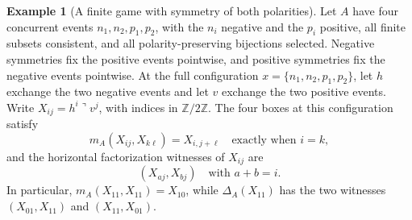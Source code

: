 \documentclass[oneside]{article}
\newcommand{\trcorner}{\mathbin{\urcorner}}
\theoremstyle{plain}
\theoremstyle{definition}
\newtheorem{example}[theorem]{Example}
\theoremstyle{remark}
\begin{document}
\begin{example}[A finite game with symmetry of both polarities]
\label{ex:cgqg-mixed-polarity-boxes}
Let \(A\) have four concurrent events \(n_1,n_2,p_1,p_2\), with
the \(n_i\) negative and the \(p_i\) positive, all finite subsets
consistent, and all polarity-preserving bijections selected. Negative
symmetries fix the positive events pointwise, and positive symmetries
fix the negative events pointwise. At the full configuration
\(x=\{n_1,n_2,p_1,p_2\}\), let \(h\) exchange the two negative
events and let \(v\) exchange the two positive events. Write
\(X_{ij}=h^i\trcorner v^j\), with indices in \(\mathbb Z/2\mathbb Z\).
The four boxes at this configuration satisfy
\[
 m_A(X_{ij},X_{k\ell})=X_{i,j+\ell}\quad\text{exactly when }i=k,
\]
and the horizontal factorization witnesses of \(X_{ij}\) are
\[
 (X_{aj},X_{bj})\quad\text{with }a+b=i.
\]
In particular, \(m_A(X_{11},X_{11})=X_{10}\), while
\(\Delta_A(X_{11})\) has the two witnesses
\((X_{01},X_{11})\) and \((X_{11},X_{01})\).
\end{example}
\end{document}

